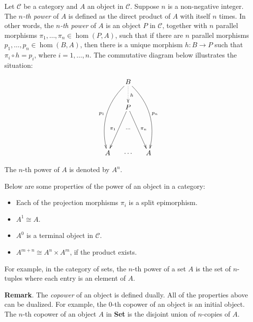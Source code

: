 \documentclass[12pt]{article}
\begin{document}
Let $\mathcal{C}$ be a category and $A$ an object in $\mathcal{C}$.  Suppose $n$ is a non-negative integer.  The \emph{$n$-th power} of $A$ is defined as the direct product of $A$ with itself $n$ times.  In other words, the \emph{$n$-th power} of $A$ is an object $P$ in $\mathcal{C}$, together with $n$ parallel morphisms $\pi_1, \ldots, \pi_n \in \hom(P,A)$, such that if there are $n$ parallel morphisms $p_1, \ldots, p_n \in \hom(B,A)$, then there is a unique morphism $h:B\to P$ such that $\pi_i\circ h=p_i$, where $i=1,\ldots, n$.  The commutative diagram below illustrates the situation:

$$\xymatrix@C=0.5cm{& B \ar@{.>}[d]^{h} \ar@/_4ex/[dddl]_{p_1} \ar@/^4ex/[dddr]^{p_n} & \\ & P \ar[ddl]_{\pi_1}="1" \ar[ddr]^{\pi_n}="2" & \\ & & \\ A & \cdots & A \ar@{}"1";"2"|-{\cdots}}$$

The $n$-th power of $A$ is denoted by $A^n$.

Below are some properties of the power of an object in a category:
\begin{itemize}
\item Each of the projection morphisms $\pi_i$ is a split epimorphism.
\item $A^1 \cong A$.
\item $A^0$ is a terminal object in $\mathcal{C}$.
\item $A^{m+n}\cong A^n \times A^m$, if the product exists.
\end{itemize}

For example, in the category of sets, the $n$-th power of a set $A$ is the set of $n$-tuples where each entry is an element of $A$.

\textbf{Remark}.  The \emph{copower} of an object is defined dually.  All of the properties above can be dualized.  For example, the $0$-th copower of an object is an initial object.  The $n$-th copower of an object $A$ in \textbf{Set} is the disjoint union of $n$-copies of $A$.
\end{document}

